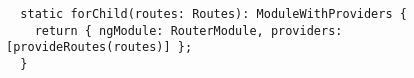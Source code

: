 \begin{verbatim}
  static forChild(routes: Routes): ModuleWithProviders {
    return { ngModule: RouterModule, providers: [provideRoutes(routes)] };
  }
\end{verbatim}
